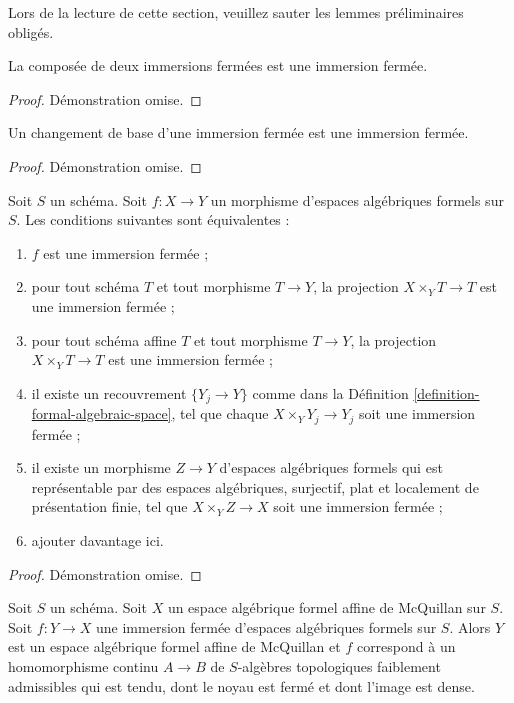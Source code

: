 \noindent
Lors de la lecture de cette section, veuillez sauter les lemmes préliminaires obligés.

\begin{lemma}
\label{lemma-composition-closed-immersion}
La composée de deux immersions fermées est une immersion fermée.
\end{lemma}

\begin{proof}
Démonstration omise.
\end{proof}

\begin{lemma}
\label{lemma-base-change-closed-immersion}
Un changement de base d'une immersion fermée est une immersion fermée.
\end{lemma}

\begin{proof}
Démonstration omise.
\end{proof}

\begin{lemma}
\label{lemma-characterize-closed-immersion}
Soit $S$ un schéma. Soit $f : X \to Y$ un morphisme d'espaces algébriques formels
sur $S$. Les conditions suivantes sont équivalentes :
\begin{enumerate}
\item $f$ est une immersion fermée ;
\item pour tout schéma $T$ et tout morphisme $T \to Y$, la projection
$X \times_Y T \to T$ est une immersion fermée ;
\item pour tout schéma affine $T$ et tout morphisme $T \to Y$,
la projection $X \times_Y T \to T$ est une immersion fermée ;
\item il existe un recouvrement $\{Y_j \to Y\}$ comme dans la
Définition \ref{definition-formal-algebraic-space},
tel que chaque $X \times_Y Y_j \to Y_j$ soit une immersion fermée ;
\item il existe un morphisme $Z \to Y$ d'espaces algébriques formels
qui est représentable par des espaces algébriques, surjectif, plat et localement
de présentation finie, tel que $X \times_Y Z \to X$ soit une
immersion fermée ;
\item ajouter davantage ici.
\end{enumerate}
\end{lemma}

\begin{proof}
Démonstration omise.
\end{proof}

\begin{lemma}
\label{lemma-closed-immersion-into-McQuillan}
Soit $S$ un schéma. Soit $X$ un espace algébrique formel affine de McQuillan
sur $S$. Soit $f : Y \to X$ une immersion fermée d'espaces algébriques formels
sur $S$. Alors $Y$ est un espace algébrique formel affine de McQuillan et
$f$ correspond à un homomorphisme continu $A \to B$ de $S$-algèbres topologiques
faiblement admissibles qui est tendu, dont le noyau est fermé et dont
l'image est dense.
\end{lemma}

